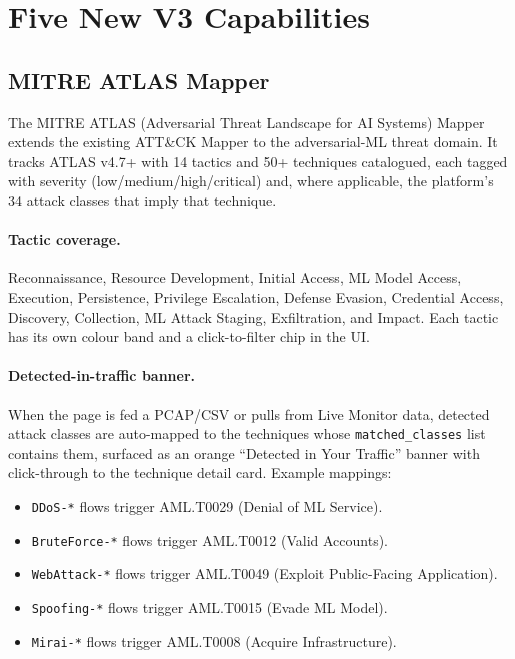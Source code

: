 \documentclass[11pt,a4paper]{article}
\begin{document}
\section{Five New V3 Capabilities}
\label{sec:v3_features}

\subsection{MITRE ATLAS Mapper}
\label{sec:atlas_mapper}

The MITRE ATLAS (Adversarial Threat Landscape for AI Systems) Mapper
extends the existing ATT\&CK Mapper to the adversarial-ML threat
domain.  It tracks ATLAS v4.7+ with 14 tactics and 50+ techniques
catalogued, each tagged with severity (low/medium/high/critical) and,
where applicable, the platform's 34 attack classes that imply that
technique.

\paragraph{Tactic coverage.} Reconnaissance, Resource Development,
Initial Access, ML Model Access, Execution, Persistence, Privilege
Escalation, Defense Evasion, Credential Access, Discovery, Collection,
ML Attack Staging, Exfiltration, and Impact.  Each tactic has its
own colour band and a click-to-filter chip in the UI.

\paragraph{Detected-in-traffic banner.} When the page is fed a
PCAP/CSV or pulls from Live Monitor data, detected attack classes are
auto-mapped to the techniques whose \texttt{matched\_classes} list
contains them, surfaced as an orange ``Detected in Your Traffic''
banner with click-through to the technique detail card.  Example
mappings:
\begin{itemize}[nosep]
  \item \texttt{DDoS-*} flows trigger AML.T0029 (Denial of ML Service).
  \item \texttt{BruteForce-*} flows trigger AML.T0012 (Valid Accounts).
  \item \texttt{WebAttack-*} flows trigger AML.T0049 (Exploit Public-Facing Application).
  \item \texttt{Spoofing-*} flows trigger AML.T0015 (Evade ML Model).
  \item \texttt{Mirai-*} flows trigger AML.T0008 (Acquire Infrastructure).
\end{itemize}
\end{document}
